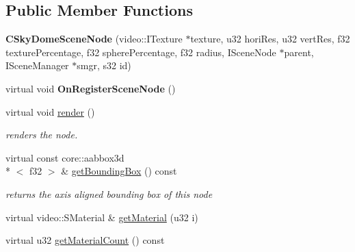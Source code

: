 \subsection*{Public Member Functions}
\begin{DoxyCompactItemize}
\item 
\hypertarget{classirr_1_1scene_1_1_c_sky_dome_scene_node_ab67f6353cfcd8b41e753fd47685ebc72}{{\bfseries C\-Sky\-Dome\-Scene\-Node} (video\-::\-I\-Texture $\ast$texture, u32 hori\-Res, u32 vert\-Res, f32 texture\-Percentage, f32 sphere\-Percentage, f32 radius, I\-Scene\-Node $\ast$parent, I\-Scene\-Manager $\ast$smgr, s32 id)}\label{classirr_1_1scene_1_1_c_sky_dome_scene_node_ab67f6353cfcd8b41e753fd47685ebc72}

\item 
\hypertarget{classirr_1_1scene_1_1_c_sky_dome_scene_node_ac04bd15348e19466a78a031987f68376}{virtual void {\bfseries On\-Register\-Scene\-Node} ()}\label{classirr_1_1scene_1_1_c_sky_dome_scene_node_ac04bd15348e19466a78a031987f68376}

\item 
\hypertarget{classirr_1_1scene_1_1_c_sky_dome_scene_node_afae2d152aef4b7f5414b6e14ca6ad44e}{virtual void \hyperlink{classirr_1_1scene_1_1_c_sky_dome_scene_node_afae2d152aef4b7f5414b6e14ca6ad44e}{render} ()}\label{classirr_1_1scene_1_1_c_sky_dome_scene_node_afae2d152aef4b7f5414b6e14ca6ad44e}

\begin{DoxyCompactList}\small\item\em renders the node. \end{DoxyCompactList}\item 
\hypertarget{classirr_1_1scene_1_1_c_sky_dome_scene_node_a91916c2a997c31c84e5a22437c1b18fb}{virtual const core\-::aabbox3d\\*
$<$ f32 $>$ \& \hyperlink{classirr_1_1scene_1_1_c_sky_dome_scene_node_a91916c2a997c31c84e5a22437c1b18fb}{get\-Bounding\-Box} () const }\label{classirr_1_1scene_1_1_c_sky_dome_scene_node_a91916c2a997c31c84e5a22437c1b18fb}

\begin{DoxyCompactList}\small\item\em returns the axis aligned bounding box of this node \end{DoxyCompactList}\item 
virtual video\-::\-S\-Material \& \hyperlink{classirr_1_1scene_1_1_c_sky_dome_scene_node_abde4032258950fe5b7d2b829d8ff5d31}{get\-Material} (u32 i)
\item 
\hypertarget{classirr_1_1scene_1_1_c_sky_dome_scene_node_a34afed5db00e799c67ce38347340d5cb}{virtual u32 \hyperlink{classirr_1_1scene_1_1_c_sky_dome_scene_node_a34afed5db00e799c67ce38347340d5cb}{get\-Material\-Count} () const }\label{classirr_1_1scene_1_1_c_sky_dome_scene_node_a34afed5db00e799c67ce38347340d5cb}


\end{DoxyCompactItemize}

